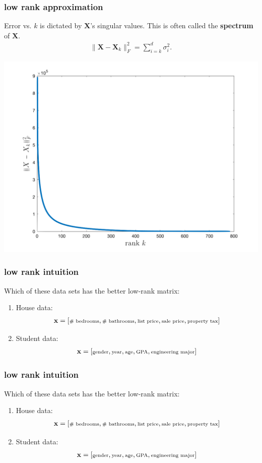\documentclass[handout,compress]{beamer}
\newcommand{\bv}[1]{\mathbf{#1}}
\begin{document}
\begin{frame}[t]
	\frametitle{low rank approximation}
	Error vs. $k$ is dictated by $\bv{X}$'s singular values. This is often called the \textbf{spectrum} of $\bv{X}$. 
	\begin{align*}
	\|\bv{X} - \bv{X}_k\|_F^2 = \sum_{i=k}^d \sigma_i^2.
	\end{align*} 
	\begin{center}
		\includegraphics[width=.6\textwidth]{pca_errors.png}
	\end{center}
\end{frame}

\begin{frame}
	\frametitle{low rank intuition}
	Which of these data sets has the better low-rank matrix:
	\begin{enumerate}
		\item  House data: 
		\begin{align*}
		\scriptsize
		\bv{x} = \left[\text{\# bedrooms},  \text{\# bathrooms}, \text{list price}, \text{sale price}, \text{property tax} \right]
		\end{align*}
		
		\item  \normalsize{Student data:}
		\begin{align*}
		\scriptsize
		\bv{x} = \left[\text{gender}, \text{year},  \text{age}, \text{GPA}, \text{engineering major}\right]
		\end{align*}	
	\end{enumerate}
\end{frame}

\begin{frame}
	\frametitle{low rank intuition}
	Which of these data sets has the better low-rank matrix:
	\begin{enumerate}
		\item  House data: 
		\begin{align*}
		\scriptsize
		\bv{x} = \left[\text{\# bedrooms},  \text{\# bathrooms}, \text{list price}, \text{sale price}, \text{property tax} \right]
		\end{align*}
		
		\item  \normalsize{Student data:}
		\begin{align*}
		\scriptsize
		\bv{x} = \left[\text{gender}, \text{year},  \text{age}, \text{GPA}, \text{engineering major}\right]
		\end{align*}	
	\end{enumerate}
\end{frame}
\end{document}

